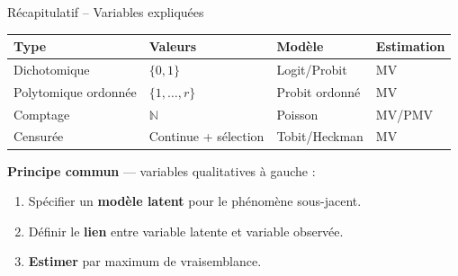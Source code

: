 \documentclass[11pt,aspectratio=169]{beamer}
\newcommand{\N}{\mathbb{N}}
\begin{document}
\begin{frame}{Récapitulatif -- Variables expliquées}

\begin{center}
    \small
    \renewcommand{\arraystretch}{1.3}
    \begin{tabular}{llll}
        \toprule
        \textbf{Type} & \textbf{Valeurs} & \textbf{Modèle} & \textbf{Estimation} \\
        \midrule
        Dichotomique & $\{0, 1\}$ & Logit/Probit & MV \\
        Polytomique ordonnée & $\{1, \ldots, r\}$ & Probit ordonné & MV \\
        Comptage & $\N$ & Poisson & MV/PMV \\
        Censurée & Continue + sélection & Tobit/Heckman & MV \\
        \bottomrule
    \end{tabular}
\end{center}

\vspace{0.3cm}

\textbf{Principe commun} --- variables qualitatives à gauche :

\begin{enumerate}

\item Spécifier un \textbf{modèle latent} pour le phénomène sous-jacent.\newline

\item Définir le \textbf{lien} entre variable latente et variable observée.\newline

\item \textbf{Estimer} par maximum de vraisemblance.

\end{enumerate}

\end{frame}
\end{document}

